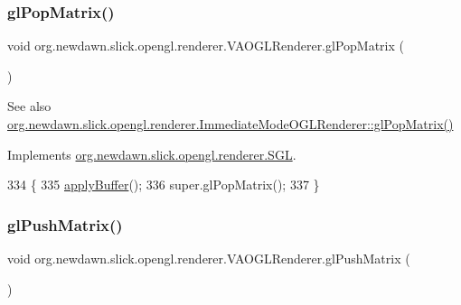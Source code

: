 \subsubsection{\texorpdfstring{gl\+Pop\+Matrix()}{glPopMatrix()}}
{\footnotesize\ttfamily void org.\+newdawn.\+slick.\+opengl.\+renderer.\+V\+A\+O\+G\+L\+Renderer.\+gl\+Pop\+Matrix (\begin{DoxyParamCaption}{ }\end{DoxyParamCaption})\hspace{0.3cm}{\ttfamily [inline]}}

\begin{DoxySeeAlso}{See also}
\mbox{\hyperlink{classorg_1_1newdawn_1_1slick_1_1opengl_1_1renderer_1_1_immediate_mode_o_g_l_renderer_aa0deb1e58ef2250ce793cd6966bcdd70}{org.\+newdawn.\+slick.\+opengl.\+renderer.\+Immediate\+Mode\+O\+G\+L\+Renderer\+::gl\+Pop\+Matrix()}} 
\end{DoxySeeAlso}


Implements \mbox{\hyperlink{interfaceorg_1_1newdawn_1_1slick_1_1opengl_1_1renderer_1_1_s_g_l_ab8fd54b37e504c0b72d8b18b90c94c41}{org.\+newdawn.\+slick.\+opengl.\+renderer.\+S\+GL}}.


\begin{DoxyCode}
334                               \{
335         \mbox{\hyperlink{classorg_1_1newdawn_1_1slick_1_1opengl_1_1renderer_1_1_v_a_o_g_l_renderer_a7c5d09419cd40761be8f849631aebab5}{applyBuffer}}();
336         super.glPopMatrix();
337     \}
\end{DoxyCode}
\mbox{\label{classorg_1_1newdawn_1_1slick_1_1opengl_1_1renderer_1_1_v_a_o_g_l_renderer_ac7380f97b774917d89fbb56270180be4}} 
\subsubsection{\texorpdfstring{gl\+Push\+Matrix()}{glPushMatrix()}}
{\footnotesize\ttfamily void org.\+newdawn.\+slick.\+opengl.\+renderer.\+V\+A\+O\+G\+L\+Renderer.\+gl\+Push\+Matrix (\begin{DoxyParamCaption}{ }\end{DoxyParamCaption})\hspace{0.3cm}{\ttfamily [inline]}}

